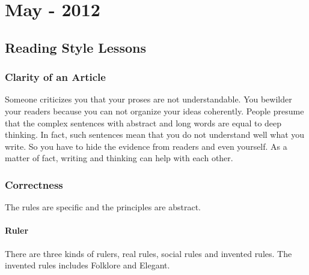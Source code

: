 \chapter{May - 2012} %

\label{ch:may:2012} %

\section{Reading Style Lessons}
\subsection{Clarity of an Article}
Someone criticizes you that your proses are not understandable. You  bewilder your readers because you can not organize your ideas coherently.  
People presume that the complex sentences with abstract and long words are equal to deep thinking. In fact, such sentences mean that you do not understand well what you write. So you have to hide the evidence from readers and even yourself.  
As a matter of fact, writing and thinking can help with each other.

\subsection{Correctness}
The rules are specific and the principles are abstract.
\subsubsection{Ruler}
There are three kinds of rulers, real rules, social rules and invented rules. The invented rules includes Folklore and Elegant.

